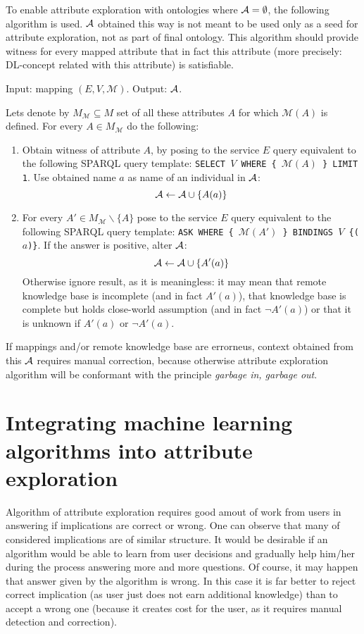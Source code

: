 \documentclass{llncs}
\newcommand{\abox}{\ensuremath\mathcal{A}}
\newcommand{\mapping}{\mathcal{M}}
\begin{document}
To enable attribute exploration with ontologies where $\abox=\emptyset$, the
following algorithm is used. $\abox$ obtained this way is not meant to be used
only as a seed for attribute exploration, not as part of final ontology. This
algorithm should provide witness for every mapped attribute that in fact this
attribute (more precisely: DL-concept related with this attribute) is
satisfiable.  
\begin{definition}[Algorithm for population of $\abox$]
Input: mapping $(E,V,\mapping)$. Output: $\abox$.

Lets denote by $M_\mapping\subseteq M$ set of all these attributes $A$ for which $\mapping(A)$ is defined.
For every $A\in M_\mapping$ do the following:
\begin{enumerate}
\item Obtain witness of attribute $A$, by posing to the service $E$ query equivalent to the following SPARQL query template:
\texttt{SELECT $V$ WHERE \{ $\mapping(A)$ \} LIMIT 1}. Use obtained name $a$ as name of an individual in $\abox$: 
\[ \abox \leftarrow \abox \cup \{ A(a) \} \]
\item For every $A'\in M_\mapping\backslash\{A\}$ pose to the service $E$ query equivalent to the following SPARQL query template:
\texttt{ASK WHERE \{ $\mapping(A')$ \} BINDINGS $V$ \{($a$)\}}. If the answer is positive, alter $\abox$:
\[ \abox \leftarrow \abox \cup \{ A'(a) \} \] Otherwise ignore result, as it
is meaningless: it may mean that remote knowledge base is incomplete (and in
fact $A'(a)$), that knowledge base is complete but holds close-world assumption
(and in fact $\lnot A'(a)$) or that it is unknown if $A'(a)$ or $\lnot A'(a)$.
\end{enumerate}
\end{definition}

If mappings and/or remote knowledge base are errorneus, context obtained from
this $\abox$ requires manual correction, because otherwise attribute
exploration algorithm will be conformant with the principle \emph{garbage in,
garbage out}.


\section{Integrating machine learning algorithms into attribute exploration}

Algorithm of attribute exploration requires good amout of work from users in answering if implications are correct or wrong. One can observe that many of considered implications are of similar structure. It would be desirable if an algorithm would be able to learn from user decisions and gradually help him/her during the process answering more and more questions. Of course, it may happen that answer given by the algorithm is wrong. In this case it is far better to reject correct implication (as user just does not earn additional knowledge) than to accept a wrong one (because it creates cost for the user, as it requires manual detection and correction).
\end{document}
